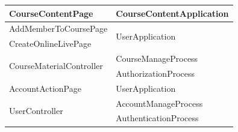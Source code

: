 \documentclass[./../main.tex]{subfiles}
\begin{document}
\begin{longtable}{|p{}|p{}|}
	CourseContentPage                               & CourseContentApplication                         \\ \hline
	AddMemberToCoursePage                           & \multirow{2}{*}{UserApplication}                 \\
	CreateOnlineLivePage                            &                                                  \\ \hline
	\multirow{2}{*}{CourseMaterialController}       & CourseManageProcess                              \\
	                                                & AuthorizationProcess                             \\ \hline
	AccountActionPage                               & UserApplication                                  \\ \hline
	\multirow{2}{*}{UserController}                 & AccountManageProcess                             \\
	                                                & AuthenticationProcess                            \\ \hline
\end{longtable}
\end{document}
